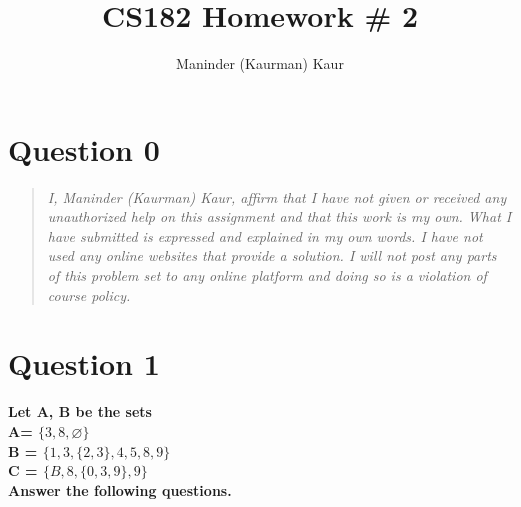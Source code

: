 \documentclass[11pt]{article}
\title{CS182 Homework \# 2}
\author{Maninder (Kaurman) Kaur}
\begin{document}
\maketitle

\section*{Question 0}
\begin{quote}
    \textit{I, Maninder (Kaurman) Kaur, affirm that I have not given or received any unauthorized help on this assignment and that this work is my own. What I have submitted is expressed and explained in my own words. I have not used any online websites that provide a solution. I will not post any parts of this problem set to any online platform and doing so is a violation of course policy.}
\end{quote}

\clearpage
\section*{Question 1}

    \textbf{Let A, B be the sets \\
A= \(\{3,8,\varnothing\}\) \\
B = \(\{1, 3, \{2, 3\}, 4, 5, 8, 9\}\) \\
C = \(\{B, 8, \{0, 3, 9\}, 9\}\) \\
Answer the following questions.}
\end{document}
